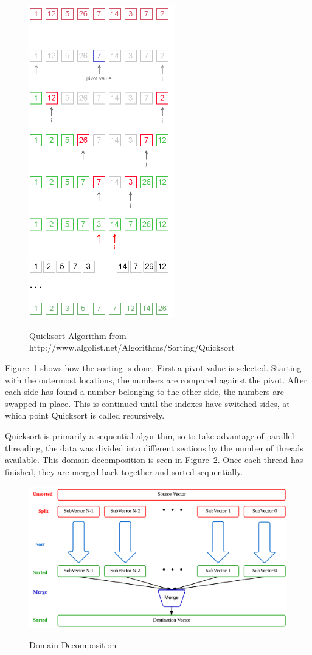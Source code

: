 \documentclass[journal]{IEEEtran}
\begin{document}
\begin{figure}[f]
  \caption{Quicksort Algorithm from http://www.algolist.net/Algorithms/Sorting/Quicksort}
  \centering
  \includegraphics[width=2.5in]{quick-sort.png}
  \label{fig:Quicksort Algorithm}
\end{figure}

Figure~\ref{fig:Quicksort Algorithm} shows how the sorting is done. First a pivot value is selected.  Starting with the outermost locations, the numbers are compared against the pivot.  After each side has found a number belonging to the other side, the numbers are swapped in place. This is continued until the indexes have switched sides, at which point Quicksort is called recursively.

Quicksort is primarily a sequential algorithm, so to take advantage of parallel threading, the data was divided into different sections by the number of threads available.  This domain decomposition is seen in Figure~\ref{fig:dd}.  Once each thread has finished, they are merged back together and sorted sequentially. 

\begin{figure}[t]
  \caption{Domain Decomposition}
  \centering
  \includegraphics[width=.75\textwidth]{include/dd.png}
  \label{fig:dd}
\end{figure}
\end{document}

